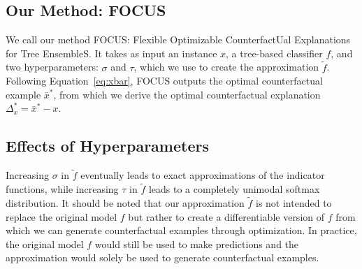 \subsection{Our Method: FOCUS}
We call our method FOCUS: Flexible Optimizable CounterfactUal Explanations for Tree EnsembleS. 
It takes as input an instance $x$, a tree-based classifier $f$, and two hyperparameters: $\sigma$ and $\tau$, which we use to create the approximation $\tilde{f}$. 
Following Equation~\ref{eq:xbar}, FOCUS outputs the optimal counterfactual example $\bar{x}^*$, from which we derive the optimal counterfactual explanation $\Delta^*_{x} = \bar{x}^* - x$. 

\subsection{Effects of Hyperparameters}
Increasing $\sigma$ in $\tilde{f}$ eventually leads to exact approximations of the indicator functions, while increasing $\tau$ in $\tilde{f}$ leads to a completely unimodal softmax distribution. 
It should be noted that our approximation $\tilde{f}$ is not intended to replace the original model $f$ but rather to create a differentiable version of $f$ from which we can generate counterfactual examples through optimization. 
In practice, the original model $f$ would still be used to make predictions and the approximation would solely be used to generate counterfactual examples. 
